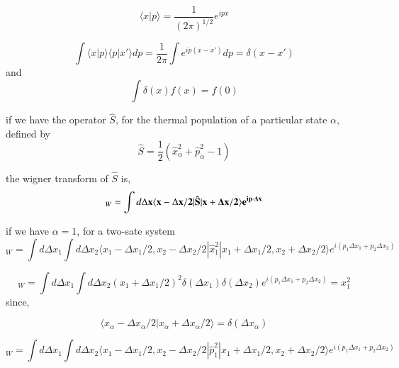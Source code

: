 \documentclass[phd,tocprelim]{cornell}
\begin{document}
\begin{equation}
\langle x|p\rangle = \frac{1}{(2\pi)^{1/2}}  e^{ipx} 
\end{equation}

\begin{equation}
\int \langle x|p\rangle \langle p|x'\rangle dp= \frac{1}{2\pi} \int e^{ip(x-x')} dp= \delta(x-x')
\end{equation}
and 
\begin{equation}
\int \delta (x)f(x)= f(0)
\end{equation}

if we have the operator $\hat{S}$, for the thermal population of a particular state $\alpha$, defined by
\begin{equation}
\hat{S}= \frac{1}{2}(\hat{x}_{\alpha}^2+\hat{p}_{\alpha}^2-1) 
\end{equation}

the wigner transform of $\hat{S}$ is,
\begin{equation}
[\hat{S}]_W=\int d {\Delta \bf{x}} \langle {\bf{x}}-\Delta \bf{x}/{2}| \hat{S} | {\bf{x}}+\Delta \bf{x}/{2} \rangle e^{i{\bf{p} \cdot \Delta x}}
\end{equation}

if we have $\alpha=1$, for a two-sate system
\begin{equation}
[\hat{x}_1^2]_W=\int d \Delta x_1 \int d \Delta x_2 \langle {x}_1-\Delta {x}_{1}/{2},{x}_2-\Delta {x}_{2}/{2} | \hat{x}_{1}^2 | {x}_1+\Delta {x}_{1}/{2},{x}_2+\Delta {x}_{2}/{2} \rangle e^{i(p_1\Delta x_1+p_2\Delta x_2)}
\end{equation}



\begin{equation}
[\hat{x}_1^2]_W=\int d \Delta x_1 \int d \Delta x_2 (x_1 +\Delta x_1/2)^2 \delta (\Delta x_1) \delta (\Delta x_2) e^{i(p_1\Delta x_1+p_2\Delta x_2)}= x_1^2
\end{equation}
since,

\begin{equation}
 \langle {x}_{\alpha}-\Delta {x}_{\alpha}/{2}|{x}_{\alpha}+\Delta {x}_{\alpha}/{2}\rangle= \delta (\Delta x_{\alpha})
\end{equation}


\begin{equation}
[\hat{p}_1^2]_W=\int d \Delta x_1 \int d \Delta x_2 \langle {x}_1-\Delta {x}_{1}/{2},{x}_2-\Delta {x}_{2}/{2} | \hat{p}_{1}^2 | {x}_1+\Delta {x}_{1}/{2},{x}_2+\Delta {x}_{2}/{2} \rangle e^{i(p_1\Delta x_1+p_2\Delta x_2)}
\end{equation}
\end{document}
